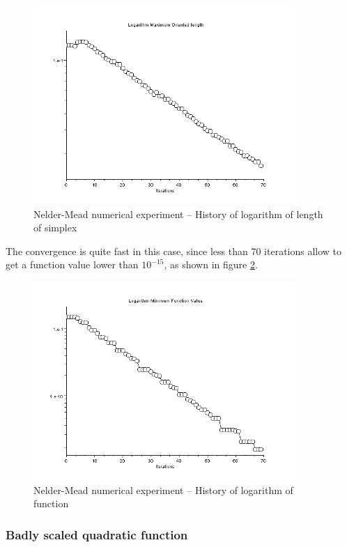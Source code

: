 \begin{figure}
\begin{center}
\includegraphics[width=10cm]{quad2bis-nm-history-sigma.png}
\end{center}
\caption{Nelder-Mead numerical experiment -- History of logarithm of length of simplex}
\label{fig-nm-numexp1-sigma}
\end{figure}

The convergence is quite fast in this case, since less than 70 iterations
allow to get a function value lower than $10^{-15}$, as shown in 
figure \ref{fig-nm-numexp1-logfopt}.

\begin{figure}
\begin{center}
\includegraphics[width=10cm]{quad2bis-nm-history-logfopt.png}
\end{center}
\caption{Nelder-Mead numerical experiment -- History of logarithm of function}
\label{fig-nm-numexp1-logfopt}
\end{figure}

\subsubsection{Badly scaled quadratic function}

